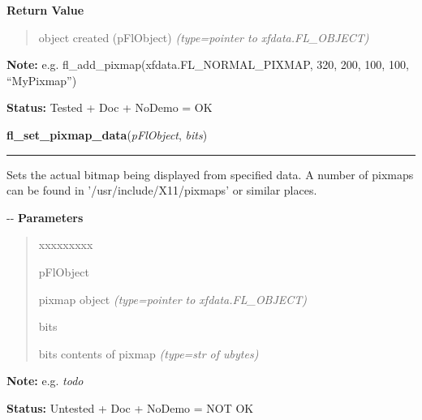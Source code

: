\begin{boxedminipage}{\funcwidth}
\begin{quote}
      \end{quote}

      \textbf{Return Value}
    \vspace{-1ex}

      \begin{quote}

object created (pFlObject)
      {\it (type=pointer to xfdata.FL\_OBJECT)}

      \end{quote}

\textbf{Note:} 
e.g. fl\_add\_pixmap(xfdata.FL\_NORMAL\_PIXMAP, 320, 200, 100, 100,       ``MyPixmap'')


\textbf{Status:} 
Tested + Doc + NoDemo = OK


    \end{boxedminipage}

    \label{xformslib:flbitmap:fl_set_pixmap_data}

    \vspace{0.5ex}

\hspace{.8\funcindent}\begin{boxedminipage}{\funcwidth}

    \raggedright \textbf{fl\_set\_pixmap\_data}(\textit{pFlObject}, \textit{bits})

    \vspace{-1.5ex}

    \rule{\textwidth}{0.5\fboxrule}
\setlength{\parskip}{2ex}

Sets the actual bitmap being displayed from specified data. A
number of pixmaps can be found in '/usr/include/X11/pixmaps' or similar
places.

-{}-
\setlength{\parskip}{1ex}
      \textbf{Parameters}
      \vspace{-1ex}

      \begin{quote}
        \begin{Ventry}{xxxxxxxxx}

          \item[pFlObject]


pixmap object
            {\it (type=pointer to xfdata.FL\_OBJECT)}

          \item[bits]


bits contents of pixmap
            {\it (type=str of ubytes)}

        \end{Ventry}

      \end{quote}

\textbf{Note:} 
e.g. \emph{todo}


\textbf{Status:} 
Untested + Doc + NoDemo = NOT OK


    \end{boxedminipage}

